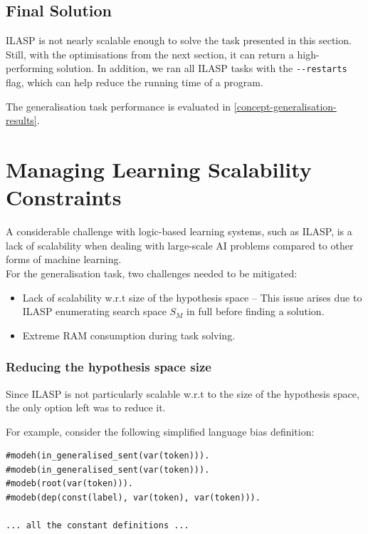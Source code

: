 \subsection{Final Solution}

ILASP is not nearly scalable enough to solve the task presented in this section. Still, with the optimisations from the next section, it can return a high-performing solution.
In addition, we ran all ILASP tasks with the \verb+--restarts+ flag, which can help reduce the running time of a program.

The generalisation task performance is evaluated in \ref{concept-generalisation-results}.

\section{Managing Learning Scalability Constraints}

A considerable challenge with logic-based learning systems, such as ILASP, is a lack of scalability when dealing with large-scale AI problems compared to other forms of machine learning. \\
For the generalisation task, two challenges needed to be mitigated: 
\begin{itemize}
    \item Lack of scalability w.r.t size of the hypothesis space -- This issue arises due to ILASP enumerating search space $S_M$ in full before finding a solution.
    \item Extreme RAM consumption during task solving.
\end{itemize}

\subsubsection{Reducing the hypothesis space size}
\label{reducing-the-hypothesis-space-size}

Since ILASP is not particularly scalable w.r.t to the size of the hypothesis space, the only option left was to reduce it.

For example, consider the following simplified language bias definition:
\begin{verbatim}
#modeh(in_generalised_sent(var(token))).
#modeb(in_generalised_sent(var(token))).
#modeb(root(var(token))).
#modeb(dep(const(label), var(token), var(token))).

... all the constant definitions ...
\end{verbatim}

